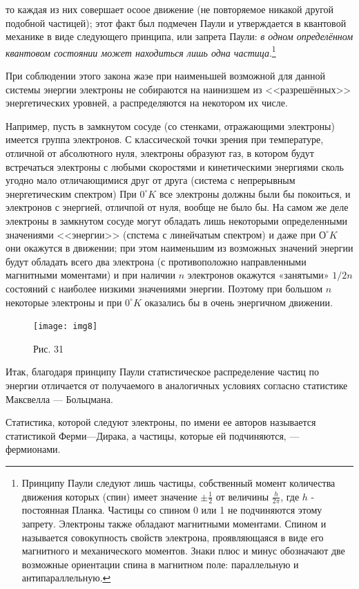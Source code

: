 \documentclass[a4paper,10pt]{book}
\begin{document}
то каждая из них совершает осоое движение (не повторяемое никакой другой подобной частицей); этот факт был подмечен Паули и утверждается в 
квантовой механике в виде следующего принципа, или запрета Паули: \emph{в одном определённом квантовом состоянии может находиться лишь одна частица}.\footnote{Принципу Паули следуют лишь частицы, собственный момент количества движения которых (спин) имеет значение $\pm\frac{1}{2}$ от величины $\frac{h}{2\pi}$, где $h$ - постоянная Планка. Частицы со спином 0 или 1 не подчиняются этому запрету.
Электроны также обладают магнитными моментами. Спином и называется совокупность свойств электрона, проявляющаяся в виде его магнитного и механического
моментов. Знаки плюс и минус обозначают две возможные ориентации спина в магнитном поле: параллельную и антипараллельную.}

При соблюдении этого закона жаэе при наименьшей возможной для данной системы энергии электроны не собираются на наинизшем из <<разрешённых>>
энергетических уровней, а распределяются на некотором их числе.

Например, пусть в замкнутом сосуде (со стенками, отражающими электроны) имеется группа электронов. С классической точки зрения при температуре, отличной от абсолютного нуля, 
электроны образуют газ, в котором будут встречаться электроны с любыми скоростями и кинетическими энергиями сколь угодно мало отличающимися друг от друга (система с непрерывным энергетическим спектром) При $0^\circ K$ все электроны должны были бы покоиться, и электронов с энергией, отличпой от нуля, вообще не было бы. На самом же деле электроны в замкнутом сосуде могут обладать лишь некоторыми определенными значениями <<энергии>> (спстема с линейчатым спектром) и даже при $О^\circ K$ они окажутся в движении; при этом наименьшим из возможных значений энергии будут обладать всего два электрона (с противоположно направленными магнитными моментами) и при наличии $n$ электронов окажутся «занятыми» $1/2 n$ состояний с наиболее низкими значениями энергии. Поэтому при большом $n$ некоторые электроны и при $0^\circ K$ оказались бы в очень энергичном движении.
\begin{figure}[h]
\texttt{[image: img8]}
\caption{Рис. 31}
\label{img8}
\end{figure}
Итак, благодаря принципу Паули статистическое распределение частиц по энергии отличается от получаемого в аналогичных условиях согласно статистике Максвелла — Больцмана. 

Статистика, которой следуют электроны, по имени ее авторов называется статистикой Ферми—Дирака, а частицы, которые ей подчиняются, — фермионами. 
\end{document}
